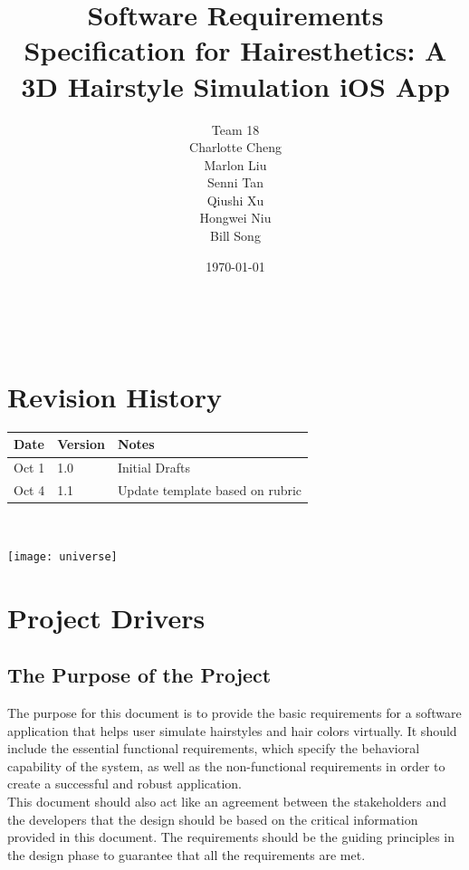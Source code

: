\documentclass[12pt]{article}
\begin{document}
\title{Software Requirements Specification for Hairesthetics: A 3D Hairstyle Simulation iOS App} 

\author{Team 18 \\ Charlotte Cheng
        \\ Marlon Liu
        \\ Senni Tan
        \\ Qiushi Xu
        \\ Hongwei Niu
        \\ Bill Song
}

\date{\today}
	
\maketitle

~\newpage


\tableofcontents
\listoftables
\listoffigures

\section*{Revision History}

\begin{tabularx}{\textwidth}{p{3cm}p{2cm}X}
\toprule {\bf Date} & {\bf Version} & {\bf Notes}\\
\midrule
Oct 1 & 1.0 & Initial Drafts\\
Oct 4 & 1.1 & Update template based on rubric\\
\bottomrule
\end{tabularx}

~\newpage

  

\texttt{[image: universe]}

\section{Project Drivers}

\subsection{The Purpose of the Project}
  
The purpose for this document is to provide the basic requirements for a software application that helps user simulate hairstyles and hair colors virtually. It should include the essential functional requirements, which specify the behavioral capability of the system, as well as the non-functional requirements in order to create a successful and robust application. \\
\newline
\noindent
This document should also act like an agreement between the stakeholders and the developers that the design should be based on the critical information provided in this document. The requirements should be the guiding principles in the design phase to guarantee that all the requirements are met. 
\end{document}
